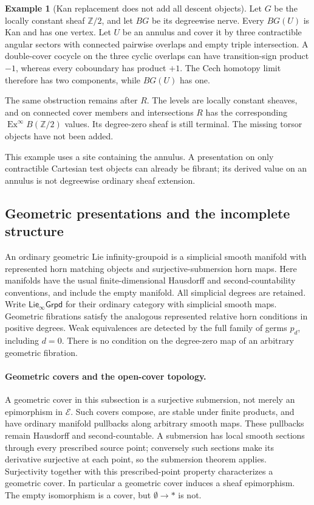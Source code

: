 \documentclass[12pt]{amsart}
\theoremstyle{definition}
\newtheorem{example}[thm]{Example}
\theoremstyle{remark}
\numberwithin{equation}{section}
\newcommand{\Z}{\mathbb Z}
\newcommand{\E}{\mathcal E}
\newcommand{\LieGpd}{\mathsf{Lie}_{\infty}\mathsf{Grpd}}
\DeclareMathOperator{\Ex}{Ex}
\begin{document}
\begin{example}[Kan replacement does not add all descent objects]
Let $G$ be the locally constant sheaf $\Z/2$, and let
$BG$ be its degreewise nerve. Every $BG(U)$ is Kan and
has one vertex. Let $U$ be an annulus and cover it by three
contractible angular sectors with connected pairwise overlaps and empty triple
intersection. A double-cover cocycle on the three cyclic overlaps
can have transition-sign product $-1$, whereas every coboundary
has product $+1$. The Cech homotopy limit therefore has two
components, while $BG(U)$ has one.

The same obstruction remains after $R$. The levels
are locally constant sheaves, and on connected cover
members and intersections $R$ has the corresponding
$\Ex^\infty B(\Z/2)$ values. Its degree-zero sheaf is
still terminal. The missing torsor objects have not
been added.

This example uses a site containing the annulus.
A presentation on only contractible Cartesian test
objects can already be fibrant; its derived value on
an annulus is not degreewise ordinary sheaf extension.
\end{example}

\subsection{Geometric presentations and the incomplete structure}

An ordinary geometric Lie infinity-groupoid is a
simplicial smooth manifold with represented horn
matching objects and surjective-submersion horn maps.
Here manifolds have the usual finite-dimensional Hausdorff
and second-countability conventions, and include the empty
manifold. All simplicial degrees are retained.
Write $\LieGpd$ for their ordinary category with simplicial smooth
maps. Geometric fibrations satisfy the analogous represented
relative horn conditions in positive degrees.
Weak equivalences are detected by the full family of germs
$p_d$, including $d=0$. There is no condition on the
degree-zero map of an arbitrary geometric fibration.

\paragraph{Geometric covers and the open-cover topology.}
A geometric cover in this subsection is a surjective
submersion, not merely an epimorphism in $\E$.
Such covers compose, are stable under finite products,
and have ordinary manifold pullbacks along arbitrary
smooth maps. These pullbacks remain Hausdorff and
second-countable. A submersion has local smooth sections
through every prescribed source point; conversely such
sections make its derivative surjective at each point,
so the submersion theorem applies. Surjectivity together
with this prescribed-point property characterizes a
geometric cover. In particular a geometric cover induces
a sheaf epimorphism. The empty isomorphism is a cover,
but $\emptyset\to *$ is not.
\end{document}

